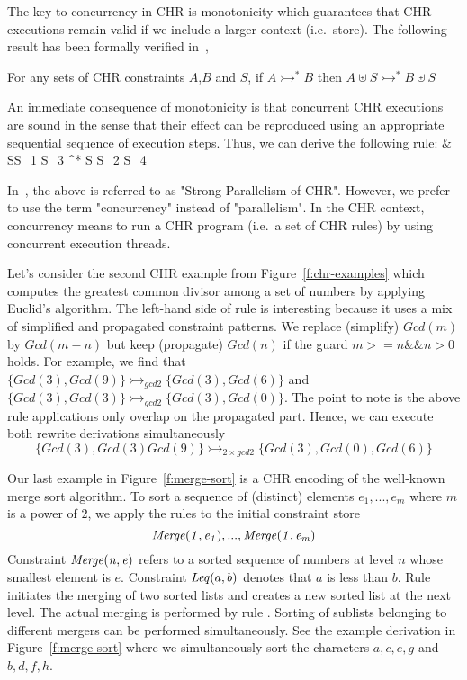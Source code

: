 \documentclass{tlp}
\begin{document}
The key to concurrency in CHR is monotonicity which 
guarantees that CHR executions remain valid if we include a larger context (i.e.~store).
The following result has been formally verified in~\cite{Abdennadher99confluenceand},
\begin{theorem}  \label{theo:monotonicity}
    For any sets of CHR constraints $A$,$B$ and $S$, if 
   $A \rightarrowtail^* B$ then $A \uplus S \rightarrowtail^* B \uplus S$
\end{theorem}
An immediate consequence of monotonicity is that concurrent CHR executions are sound
in the sense that their effect can be reproduced using an appropriate sequential
sequence of execution steps. Thus, we can derive the following  rule:
 &
          {S\uplus S_1 \uplus S_3 \rightarrowtail^* S \uplus S_2 \uplus S_4}
\eda

In~\cite{union-find}, the above is referred to as "Strong Parallelism of CHR".
However, we prefer to use the term "concurrency" instead of "parallelism".
In the CHR context, concurrency means to run a CHR program (i.e.~a set of CHR rules)
by using concurrent execution threads.

Let's consider the second CHR example from Figure~\ref{f:chr-examples}  
which computes the greatest common divisor among a set of numbers
by applying Euclid's algorithm. 
The left-hand side of rule  is interesting
because it uses a mix of simplified and propagated constraint patterns.
We replace (simplify) $\mathit{Gcd(m)}$ by $\mathit{Gcd(m-n)}$ but keep (propagate) $\mathit{Gcd(n)}$
if the guard $m>=n \&\& n>0$ holds.
For example, we find that
$\{ \mathit{Gcd(3),Gcd(9)} \}
\rightarrowtail_{gcd2}  \{\mathit{Gcd(3),Gcd(6)}  \}$
and  $\{ \mathit{Gcd(3), Gcd(3)} \}
\rightarrowtail_{gcd2} \{ \mathit{Gcd(3), Gcd(0)} \}$.
The point to note is the above rule applications only overlap on the propagated part.
Hence, we can execute both rewrite derivations simultaneously
$$\{ \mathit{Gcd(3),Gcd(3) Gcd(9)} \} \rightarrowtail_{2 \times gcd2} \{ \mathit{Gcd(3), Gcd(0), Gcd(6)} \}$$

Our last example in Figure~\ref{f:merge-sort} is a CHR encoding of the well-known merge sort algorithm.
To sort a sequence of (distinct) elements $e_1,...,e_m$ where
$m$ is a power of $2$, we apply the rules to
the initial constraint store 
$$\mathit{\mathit{Merge}(1,e_1),...,\mathit{Merge}(1,e_m)}$$
Constraint $\mathit{\mathit{Merge}(n,e)}$ refers to a sorted sequence of numbers at level $n$ whose smallest
element is $e$. Constraint $\mathit{Leq}(a,b)$ denotes that $a$ is less than $b$.
Rule  initiates the merging of two sorted lists and creates
a new sorted list at the next level. The actual merging
is performed by rule .
Sorting of sublists belonging to different mergers can be performed simultaneously.
See the example derivation in Figure~\ref{f:merge-sort} where
we simultaneously sort the characters $a,c,e,g$ and $b,d,f,h$.
\end{document}
